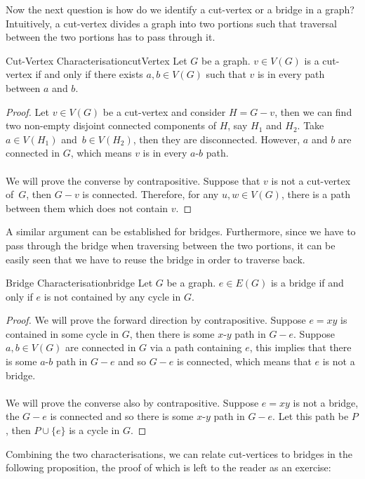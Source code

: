 \documentclass[math]{amznotes}
\theoremstyle{remark}
\begin{document}
Now the next question is how do we identify a cut-vertex or a bridge in a graph? Intuitively, a cut-vertex divides a graph into two portions such that traversal between the two portions has to pass through it.
\begin{thmbox}{Cut-Vertex Characterisation}{cutVertex}
    Let $G$ be a graph. $v \in V(G)$ is a cut-vertex if and only if there exists $a, b \in V(G)$ such that $v$ is in every path between $a$ and $b$.
    \tcblower
    \begin{proof}
        Let $v \in V(G)$ be a cut-vertex and consider $H = G - v$, then we can find two non-empty disjoint connected components of $H$, say $H_1$ and $H_2$. Take $a \in V(H_1)$ and~$b \in V(H_2)$, then they are disconnected. However, $a$ and $b$ are connected in $G$, which means $v$ is in every $a$-$b$ path.
        \\\\
        We will prove the converse by contrapositive. Suppose that $v$ is not a cut-vertex of~$G$, then $G - v$ is connected. Therefore, for any $u, w \in V(G)$, there is a path between them which does not contain $v$.
    \end{proof}
\end{thmbox}
A similar argument can be established for bridges. Furthermore, since we have to pass through the bridge when traversing between the two portions, it can be easily seen that we have to reuse the bridge in order to traverse back.
\begin{thmbox}{Bridge Characterisation}{bridge}
    Let $G$ be a graph. $e \in E(G)$ is a bridge if and only if $e$ is not contained by any cycle in $G$.
    \tcblower
    \begin{proof}
        We will prove the forward direction by contrapositive. Suppose $e = xy$ is contained in some cycle in $G$, then there is some $x$-$y$ path in $G - e$. Suppose $a, b \in V(G)$ are connected in $G$ via a path containing $e$, this implies that there is some $a$-$b$ path in $G - e$ and so $G - e$ is connected, which means that $e$ is not a bridge.
        \\\\
        We will prove the converse also by contrapositive. Suppose $e = xy$ is not a bridge, the $G - e$ is connected and so there is some $x$-$y$ path in $G - e$. Let this path be $P$, then $P \cup \{e\}$ is a cycle in $G$.
    \end{proof}
\end{thmbox}
Combining the two characterisations, we can relate cut-vertices to bridges in the following proposition, the proof of which is left to the reader as an exercise:
\end{document}
